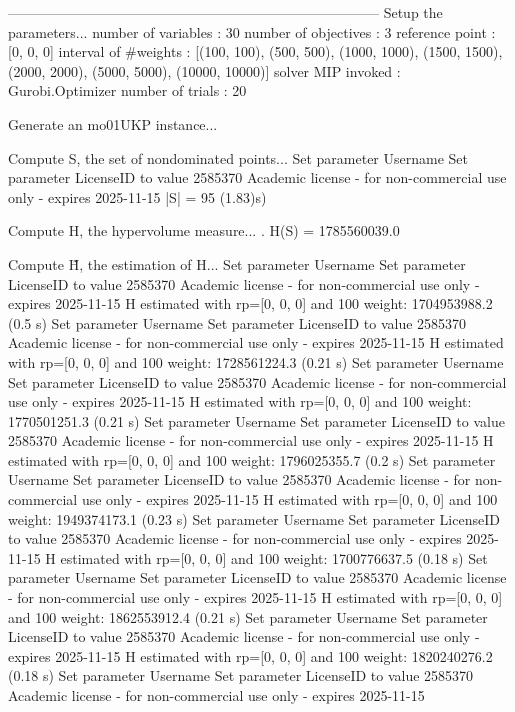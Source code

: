 --------------------------------------------------------------------------------
Setup the parameters...
  number of variables  : 30
  number of objectives : 3
  reference point      : [0, 0, 0]
  interval of #weights : [(100, 100), (500, 500), (1000, 1000), (1500, 1500), (2000, 2000), (5000, 5000), (10000, 10000)]
  solver MIP invoked   : Gurobi.Optimizer
  number of trials     : 20

Generate an mo01UKP instance...

Compute S, the set of nondominated points...
Set parameter Username
Set parameter LicenseID to value 2585370
Academic license - for non-commercial use only - expires 2025-11-15
  |S|  = 95 (1.83)s)

Compute H, the hypervolume measure...
. H(S) = 1785560039.0

Compute H̃, the estimation of H...
Set parameter Username
Set parameter LicenseID to value 2585370
Academic license - for non-commercial use only - expires 2025-11-15
  H estimated with rp=[0, 0, 0] and 100 weight:  1704953988.2  (0.5 s)
Set parameter Username
Set parameter LicenseID to value 2585370
Academic license - for non-commercial use only - expires 2025-11-15
  H estimated with rp=[0, 0, 0] and 100 weight:  1728561224.3  (0.21 s)
Set parameter Username
Set parameter LicenseID to value 2585370
Academic license - for non-commercial use only - expires 2025-11-15
  H estimated with rp=[0, 0, 0] and 100 weight:  1770501251.3  (0.21 s)
Set parameter Username
Set parameter LicenseID to value 2585370
Academic license - for non-commercial use only - expires 2025-11-15
  H estimated with rp=[0, 0, 0] and 100 weight:  1796025355.7  (0.2 s)
Set parameter Username
Set parameter LicenseID to value 2585370
Academic license - for non-commercial use only - expires 2025-11-15
  H estimated with rp=[0, 0, 0] and 100 weight:  1949374173.1  (0.23 s)
Set parameter Username
Set parameter LicenseID to value 2585370
Academic license - for non-commercial use only - expires 2025-11-15
  H estimated with rp=[0, 0, 0] and 100 weight:  1700776637.5  (0.18 s)
Set parameter Username
Set parameter LicenseID to value 2585370
Academic license - for non-commercial use only - expires 2025-11-15
  H estimated with rp=[0, 0, 0] and 100 weight:  1862553912.4  (0.21 s)
Set parameter Username
Set parameter LicenseID to value 2585370
Academic license - for non-commercial use only - expires 2025-11-15
  H estimated with rp=[0, 0, 0] and 100 weight:  1820240276.2  (0.18 s)
Set parameter Username
Set parameter LicenseID to value 2585370
Academic license - for non-commercial use only - expires 2025-11-15
